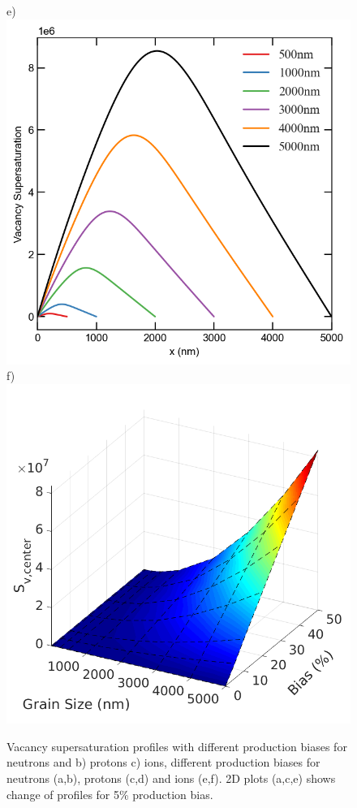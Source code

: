 \documentclass[utf8]{frontiersSCNS} %
\begin{document}
\begin{figure}[h!]
        e)\includegraphics[scale=0.55]{super_saturation_500-5000nm-ion-5}
        f)\includegraphics[scale=0.38]{data_ion_Sv_center}
        \caption{Vacancy supersaturation profiles with different production biases for neutrons and b) protons c) ions, different production biases for neutrons (a,b), protons (c,d) and ions (e,f).  2D plots (a,c,e) shows change of profiles for 5\% production bias.}
        \label{figure:vacancy_supersaturation_neutron}
    \end{figure}
\end{document}
